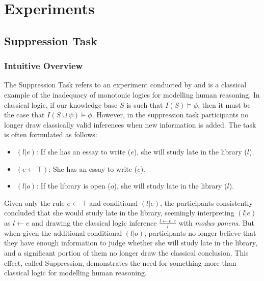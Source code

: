 \chapter{Experiments} \label{chp:experiments}
\section{Suppression Task} \label{sec:sup}
\subsection{Intuitive Overview} \label{ssec:sup_intuition}
The Suppression Task refers to an experiment conducted by \cite{byrne1989suppressing} and is a classical example of the inadequacy of monotonic logics for modelling human reasoning. In classical logic, if our knowledge base $S$ is such that $I(S) \models \phi$, then it must be the case that $I(S \cup \psi) \models \phi$. However, in the suppression task participants no longer draw classically valid inferences when new information is added. The task is often formulated as follows:

\begin{itemize}
\item $(l|e)$: If she has an essay to write ($e$), she will study late in the library ($l$).
\item $(e \leftarrow \top)$: She has an essay to write ($e$).
\item $(l|o)$: If the library is open ($o$), she will study late in the library ($l$).
\end{itemize}

Given only the rule $e\leftarrow \top$ and conditional $(l|e)$, the participants consistently concluded that she would study late in the library, seemingly interpreting $(l|e)$ as $l\leftarrow e$ and drawing the classical logic inference $\frac{l \leftarrow e, e}{l}$ with \textit{modus ponens}. But when given the additional conditional $(l|o)$, participants no longer believe that they have enough information to judge whether she will study late in the library, and a significant portion of them no longer draw the classical conclusion. This effect, called Suppression, demonstrates the need for something more than classical logic for modelling human reasoning.

